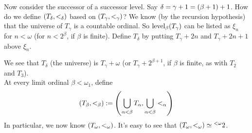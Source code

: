 \begin{boxconstruction}
    Now consider the successor of a successor level. Say $\delta = \gamma + 1 = \left( \beta + 1 \right) + 1$. How do we define $\left( T_{\delta}, <_{\delta} \right)$ based on $\left( T_{\gamma}, <_{\gamma} \right)$? We know (by the recursion hypothesis) that the universe of $T_{\gamma}$ is a countable ordinal. So $\operatorname{level}_{\beta}\!\left( T_{\gamma} \right)$ can be listed as $\xi_n$ for $n < \omega$ (for $n < 2^{\beta}$, if $\beta$ is finite). Define $T_{\delta}$ by putting $T_{\gamma} + 2n$ and $T_{\gamma} + 2n + 1$ above $\xi_n$.
    \begin{figure}[H]
        \centering
    \end{figure}
    We see that $T_{\delta}$ (the universe) is $T_{\gamma} + \omega$ (or $T_{\gamma} + 2^{\beta + 1}$, if $\beta$ is finite, as with $T_2$ and $T_3$). \\

    At every limit ordinal $\beta < \omega_1$, define
    \begin{align*}
        \left( T_{\beta}, <_{\beta} \right) := \left( \bigcup_{\alpha < \beta} T_{\alpha}, \bigcup_{\alpha < \beta} <_{\alpha} \right)
    \end{align*}
    In particular, we now know $\left( T_{\omega}, <_{\omega} \right)$. It's easy to see that $\left( T_{\omega}, <_{\omega} \right) \simeq {^{<\omega}2}$.


\end{boxconstruction}
